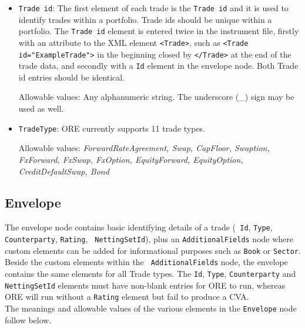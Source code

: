 \begin{itemize}
\item {\tt Trade id}: The first element of each trade is the {\tt Trade id} and it is used to identify trades within a
  portfolio. Trade ids should be unique within a portfolio.  The {\tt Trade id} element is entered twice in the
  instrument file, firstly with an attribute to the XML element {\tt <Trade>}, such as {\tt <Trade id="ExampleTrade">}
  in the beginning closed by {\tt </Trade>} at the end of the trade data, and secondly with a {\tt Id} element in the
  envelope node.  Both Trade id entries should be identical.

Allowable values:  Any alphanumeric string. The underscore (\_) sign may be used as well. 


\item {\tt TradeType}: %
ORE currently supports 11 trade types.

Allowable values: \emph{ForwardRateAgreement, Swap, CapFloor, Swaption, FxForward, FxSwap, FxOption,
EquityForward, EquityOption, CreditDefaultSwap, Bond}

\end{itemize}

\subsection{Envelope}\label{ss:envelope}
The envelope node contains basic identifying details of a trade ({\tt
  Id}, {\tt Type}, {\tt Counterparty}, {\tt Rating}, {\tt
  NettingSetId}), plus an {\tt AdditionalFields} node where custom
elements can be added for informational purposes such as {\tt Book} or
{\tt Sector}. Beside the custom elements within the {\tt
  AdditionalFields} node, the envelope contains the same elements for
all Trade types.  The {\tt Id}, {\tt Type}, {\tt Counterparty} and
{\tt NettingSetId} elements must have non-blank entries for ORE to
run, whereas ORE will run without a {\tt Rating} element but fail to
produce a CVA. \\

The meanings and allowable values of the various elements in the \lstinline!Envelope!  node follow below.

